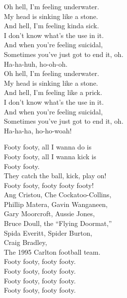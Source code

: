 
Oh hell, I'm feeling underwater. \\
My head is sinking like a stone. \\
And hell, I'm feeling kinda sick. \\
I don't know what's the use in it. \\
And when you're feeling suicidal, \\
Sometimes you've just got to end it, oh. \\

Ha-ha-huh, ho-oh-oh. \\

Oh hell, I'm feeling underwater. \\
My head is sinking like a stone. \\
And hell, I'm feeling like a prick. \\
I don't know what's the use in it. \\
And when you're feeling suicidal, \\
Sometimes you've just got to end it, oh. \\

Ha-ha-ha, ho-ho-woah! \\




Footy footy, all I wanna do is \\
Footy footy, all I wanna kick is \\
Footy footy. \\
They catch the ball, kick, play on! \\
Footy footy, footy footy footy! \\

Ang Cristou, Che Cockatoo-Collins, \\
Phillip Matera, Gavin Wanganeen, \\
Gary Moorcroft, Aussie Jones, \\
Bruce Doull, the ``Flying Doormat,'' \\
Spida Everitt, Spider Burton, \\
Craig Bradley, \\
The 1995 Carlton football team. \\

Footy footy, footy footy. \\
Footy footy, footy footy. \\
Footy footy, footy footy. \\
Footy footy, footy footy. \\


